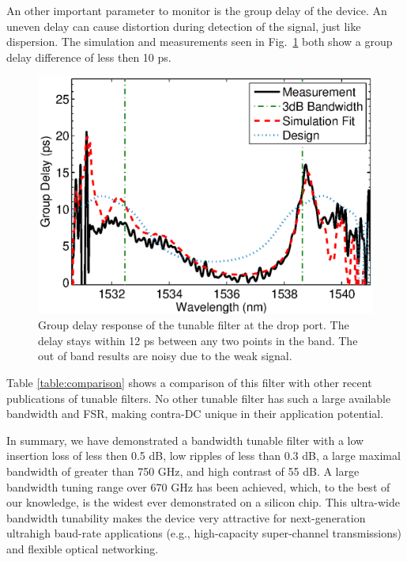 \documentclass[osajnl,twocolumn,showpacs,superscriptaddress,10pt]{revtex4-1}
\begin{document}
An other important parameter to monitor is the group delay of the device. An uneven delay can cause distortion during detection of the signal, just like dispersion. The simulation and measurements seen in Fig.~\ref{fig:phase} both show a group delay difference of less then 10 ps.
\begin{figure}[tbp]
\centering
\includegraphics[width=.99\columnwidth]{data/Phase2}
\caption{ Group delay response of the tunable filter at the drop port. The delay stays within 12 ps between any two points in the band. The out of band results are noisy due to the weak signal.}
\label{fig:phase}
\end{figure}

Table \ref{table:comparison} shows a comparison of this filter with other recent publications of tunable filters. No other tunable filter has such a large available bandwidth and FSR, making contra-DC unique in their application potential.


In summary, we have demonstrated a bandwidth tunable filter with a low insertion loss of less then 0.5 dB, low ripples of less than 0.3 dB, a large maximal bandwidth of greater than 750 GHz, and high contrast of 55 dB. 
A large bandwidth tuning range over 670 GHz has been achieved, which, to the best of our knowledge, is the widest ever demonstrated on a silicon chip. 
This ultra-wide bandwidth tunability makes the device very attractive for next-generation ultrahigh baud-rate applications (e.g., high-capacity super-channel transmissions) and flexible optical networking. 
\end{document}
